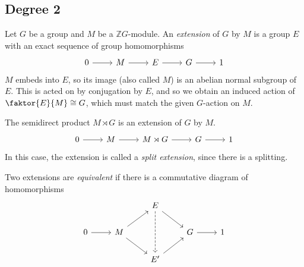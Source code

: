 \subsection{Degree 2}
\begin{definition}
    Let \( G \) be a group and \( M \) be a \( \mathbb Z G \)-module.
    An \emph{extension} of \( G \) by \( M \) is a group \( E \) with an exact sequence of group homomorphisms
\[\begin{tikzcd}
	0 & M & E & G & 1
	\arrow[from=1-1, to=1-2]
	\arrow[from=1-2, to=1-3]
	\arrow[from=1-3, to=1-4]
	\arrow[from=1-4, to=1-5]
\end{tikzcd}\]
    \( M \) embeds into \( E \), so its image (also called \( M \)) is an abelian normal subgroup of \( E \).
    This is acted on by conjugation by \( E \), and so we obtain an induced action of \( \faktor{E}{M} \cong G \), which must match the given \( G \)-action on \( M \).
\end{definition}
\begin{example}
    The semidirect product \( M \rtimes G \) is an extension of \( G \) by \( M \).
\[\begin{tikzcd}
	0 & M & {M \rtimes G} & G & 1
	\arrow[from=1-1, to=1-2]
	\arrow[from=1-2, to=1-3]
	\arrow[from=1-3, to=1-4]
	\arrow[from=1-4, to=1-5]
\end{tikzcd}\]
    In this case, the extension is called a \emph{split extension}, since there is a splitting.
\end{example}
\begin{definition}
    Two extensions are \emph{equivalent} if there is a commutative diagram of homomorphisms
\[\begin{tikzcd}
	&& E \\
	0 & M && G & 1 \\
	&& {E'}
	\arrow[from=2-1, to=2-2]
	\arrow[from=2-2, to=1-3]
	\arrow[from=1-3, to=2-4]
	\arrow[from=2-4, to=2-5]
	\arrow[dashed, from=1-3, to=3-3]
	\arrow[from=3-3, to=2-4]
	\arrow[from=2-2, to=3-3]
\end{tikzcd}\]
\end{definition}
